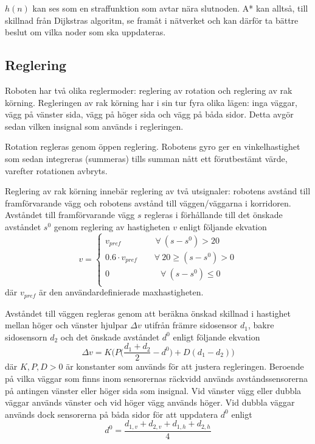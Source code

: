 \documentclass[11pt]{article}
\begin{document}
\begin{flushleft}
$h(n)$ kan ses som en straffunktion som avtar nära slutnoden. A* kan alltså, till skillnad från Dijkstras algoritm, se framåt i nätverket och kan därför ta bättre beslut om vilka noder som ska uppdateras.

\subsection{Reglering}\label{subsection:reglering}
Roboten har två olika reglermoder: reglering av rotation och reglering av rak körning. Regleringen av rak körning har i sin tur fyra olika lägen: inga väggar, vägg på vänster sida, vägg på höger sida och vägg på båda sidor. Detta avgör sedan vilken insignal som används i regleringen.

Rotation regleras genom öppen reglering. Robotens gyro ger en vinkelhastighet som sedan integreras (summeras) tills summan nått ett förutbestämt värde, varefter rotationen avbryts.

Reglering av rak körning innebär reglering av två utsignaler: robotens avstånd till framförvarande vägg och robotens avstånd till väggen/väggarna i korridoren. Avståndet till framförvarande vägg $s$ regleras i förhållande till det önskade avståndet $s^0$ genom reglering av hastigheten $v$ enligt följande ekvation
\begin{equation*}
	v = 
	\begin{cases}
		v_{pref} \qquad\qquad \forall \ (s - s^0) > 20 \\
		0.6 \cdot v_{pref} \qquad \forall \ 20 \geq (s - s^0) > 0 \\
		0 \qquad\qquad\qquad \forall \ (s - s^0)\leq 0 \\
	\end{cases}
\end{equation*}
där $v_{pref}$ är den användardefinierade maxhastigheten.

Avståndet till väggen regleras genom att beräkna önskad skillnad i hastighet mellan höger och vänster hjulpar $\Delta v$ utifrån främre sidosensor $d_1$, bakre sidosensorn $d_2$ och det önskade avståndet $d^0$ enligt följande ekvation
\begin{equation*}
	\Delta v = K \Bigg( P \Big( \frac {d_1 + d_2} {2} - d^0 \Big) + D (d_1 - d_2) \Bigg)
\end{equation*}
där $K, P, D > 0$ är konstanter som används för att justera regleringen. Beroende på vilka väggar som finns inom sensorernas räckvidd används avståndssensorerna på antingen vänster eller höger sida som insignal. Vid vänster vägg eller dubbla väggar används vänster och vid höger vägg används höger. Vid dubbla väggar används dock sensorerna på båda sidor för att uppdatera  $d^0$ enligt
\begin{equation*}
	d^0 = \frac {d_{1,v} + d_{2,v} + d_{1,h} + d_{2,h}} {4}
\end{equation*}


\end{flushleft}
\end{document}

